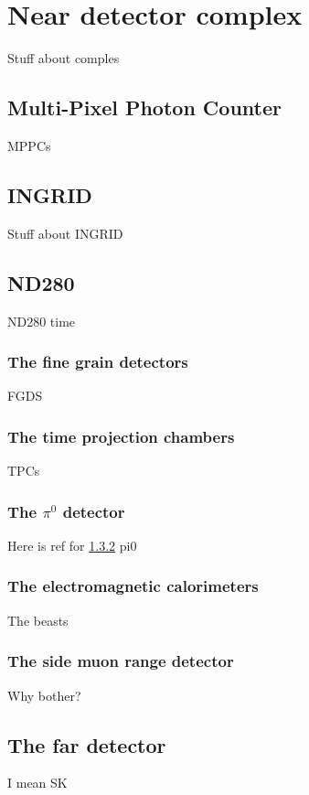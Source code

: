 \section{Near detector complex}
\label{sec:NearDetectorComplex}
Stuff about comples

\subsection{Multi-Pixel Photon Counter}
\label{subsec:MPPC}
MPPCs

\subsection{INGRID}
\label{subsec:INGRID}
Stuff about INGRID

\subsection{ND280}
\label{subsec:ND280}
ND280 time

\subsubsection{The fine grain detectors}
\label{subsubsec:FGD}
FGDS

\subsubsection{The time projection chambers}
\label{subsubsec:TPC}
TPCs

\subsubsection{The $\pi^0$ detector}
\label{subsubsec:pi0detector}
Here is ref for \ref{subsubsec:TPC}
pi0

\subsubsection{The electromagnetic calorimeters}
\label{subsubsec:ecal}
The beasts

\subsubsection{The side muon range detector}
\label{subsubsec:smrd}
Why bother?

\subsection{The far detector}
I mean SK



